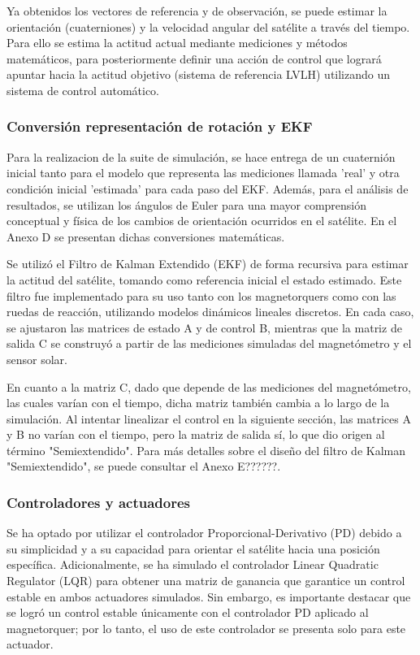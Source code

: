 Ya obtenidos los vectores de referencia y de observación, se puede estimar la orientación (cuaterniones) y la velocidad angular del satélite a través del tiempo. Para ello se estima la actitud actual mediante mediciones y métodos matemáticos, para posteriormente definir una acción de control que logrará apuntar hacia la actitud objetivo (sistema de referencia LVLH) utilizando un sistema de control automático.

\subsubsection{Conversión representación de rotación y EKF}

Para la realizacion de la suite de simulación, se hace entrega de un cuaternión inicial tanto para el modelo que representa las mediciones llamada 'real' y otra condición inicial 'estimada' para cada paso del EKF. Además, para el análisis de resultados, se utilizan los ángulos de Euler para una mayor comprensión conceptual y física de los cambios de orientación ocurridos en el satélite. En el Anexo D se presentan dichas conversiones matemáticas.

Se utilizó el Filtro de Kalman Extendido (EKF) de forma recursiva para estimar la actitud del satélite, tomando como referencia inicial el estado estimado. Este filtro fue implementado para su uso tanto con los magnetorquers como con las ruedas de reacción, utilizando modelos dinámicos lineales discretos. En cada caso, se ajustaron las matrices de estado A y de control B, mientras que la matriz de salida C se construyó a partir de las mediciones simuladas del magnetómetro y el sensor solar.

En cuanto a la matriz C, dado que depende de las mediciones del magnetómetro, las cuales varían con el tiempo, dicha matriz también cambia a lo largo de la simulación. Al intentar linealizar el control en la siguiente sección, las matrices A y B no varían con el tiempo, pero la matriz de salida sí, lo que dio origen al término "Semiextendido". Para más detalles sobre el diseño del filtro de Kalman "Semiextendido", se puede consultar el Anexo E??????.

\subsubsection{Controladores y actuadores}

Se ha optado por utilizar el controlador Proporcional-Derivativo (PD) debido a su simplicidad y a su capacidad para orientar el satélite hacia una posición específica. Adicionalmente, se ha simulado el controlador Linear Quadratic Regulator (LQR) para obtener una matriz de ganancia que garantice un control estable en ambos actuadores simulados. Sin embargo, es importante destacar que se logró un control estable únicamente con el controlador PD aplicado al magnetorquer; por lo tanto, el uso de este controlador se presenta solo para este actuador.

